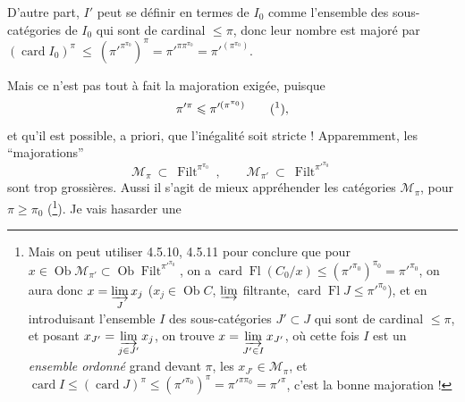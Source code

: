 \documentclass[11pt]{article}
\newcommand{\printedpage}[1]{\marginpar{\footnotesize p.~#1}}
\newcommand{\msp}[1]{\marginpar{\footnotesize [#1]}}
\newcommand{\Filt}{\operatorname{Filt}}
\newcommand{\Ob}{\operatorname{Ob}}
\newcommand{\card}{\operatorname{card}}
\newcommand{\Fl}{\operatorname{Fl}}
\begin{document}
D'autre part, $I'$ peut se définir en termes de $I_0$ comme l'ensemble des sous-catégories de $I_0$ qui sont de cardinal $\leqslant \pi$, donc leur nombre est majoré par $(\card I_0)^\pi \ \leqslant \ (\pi'^{\pi^{\pi_0}})^\pi = \pi'^{\pi\pi^{\pi_0}} = \pi'^{(\pi^{\pi_0})}$.

Mais ce n'est pas tout à fait la majoration exigée, puisque
\[
\pi'^{\pi} \leqslant \pi'^{(\pi^{\pi_0})} \qquad \text{(\footnotemark)},
\]
%
et qu'il est possible, a priori, que l'inégalité
\printedpage{38}
\msp{page 125}
soit stricte ! Apparemment, les ``majorations''
\[
\mathcal{M}_\pi \ \subset \ \Filt^{\pi^{\pi_0}} \ , \qquad \mathcal{M}_{\pi'} \ \subset \ \Filt^{\pi'^{\pi_0}}
\]
sont trop grossières. Aussi il s'agit de mieux appréhender les catégories $\mathcal{M}_\pi$, pour $\pi \geqslant \pi_0$ (\footnote{Mais on peut utiliser 4.5.10, 4.5.11 pour conclure que pour $x \in \Ob \mathcal{M}_{\pi'} \subset \Ob \Filt^{\pi'^{\pi_0}}$, on a $\card \Fl(C_0/x) \leqslant (\pi'^{\pi_0})^{\pi_0} = \pi'^{\pi_0}$, on aura donc $x = \varinjlim\limits_{J} x_j$ ($x_j \in \Ob C$, $\varinjlim$ filtrante, $\card \Fl J \leqslant \pi'^{\pi_0}$), et en introduisant l'ensemble $I$ des sous-catégories $J' \subset J$ qui sont de cardinal $\leqslant \pi$, et posant $x_{J'} = \varinjlim\limits_{j \in J'} x_j$, on trouve $x = \varinjlim\limits_{J' \in I} x_{J'}$, où cette fois $I$ est un \textit{ensemble ordonné} grand devant $\pi$, les $x_{J'} \in \mathcal{M}_\pi$, et $\card I \leqslant (\card J)^\pi \leqslant (\pi'^{\pi_0})^\pi = \pi'^{\pi\pi_0} = \pi'^{\pi}$, c'est la bonne majoration !}). Je vais hasarder une
\end{document}
